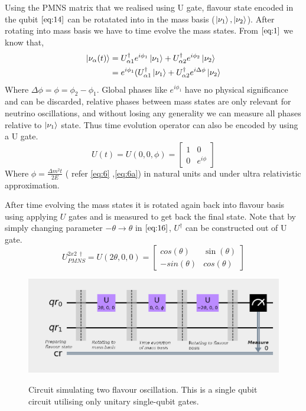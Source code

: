 \documentclass[12pt,a4paper]{report}
\begin{document}
Using the PMNS matrix that we realised using U gate, flavour state encoded in the qubit $\ref{eq:14}$ can be rotatated into in the mass basis ($\ket{\nu_{1}},\ket{\nu_{2}}$). After rotating into mass basis we have to time evolve the mass states. From $\ref{eq:1}$ we know that,
\begin{gather*}
\begin{split}
\ket{\nu_{\alpha}(t)}& = U_{\alpha 1}^{\dagger}e^{i\phi_{1}}\ket{\nu_{1}} + U_{\alpha 2}^{\dagger}e^{i\phi_{2}}\ket{\nu_{2}}\\
&=e^{i\phi_{1}}( U_{\alpha 1}^{\dagger}\ket{\nu_{1}} + U_{\alpha 2}^{\dagger} e^{ i\Delta\phi}\ket{\nu_{2}}
\end{split}
\end{gather*}
Where $\Delta\phi=\phi = \phi_{2}-\phi_{1}$.
Global phases like $e^{i\phi_{1}}$ have no physical significance and can be discarded\cite{benenti}, relative phases between mass states are only relevant for neutrino oscillations, and without losing any generality we can measure all phases relative to $\ket{\nu_{1}}$ state. Thus time evolution operator can also be encoded by using a U gate.
\begin{equation}
U(t) = U(0,0,\phi) = \begin{bmatrix} 1 & 0 \\ 0 & e^{i\phi} \end{bmatrix}
\end{equation}
Where $\phi = \frac {\Delta m^{2} t}{2E}$ ( refer \ref{eq:6} ,\ref{eq:6a}) in natural units and under ultra relativistic approximation.\par
After time evolving the mass states it is rotated again back into flavour basis using applying $U$ gates and is measured to get back the final state. Note that by simply changing parameter $-\theta \rightarrow \theta$ in $\ref{eq:16}$, $U^{\dagger}$ can be constructed out of U gate. 
\begin{equation}
U_{PMNS}^{2x2 \ \dagger}= U(2\theta,0,0) = \begin{bmatrix} cos(\theta) & \sin(\theta) \\ -sin(\theta) & cos(\theta) \end{bmatrix}
\end{equation}
\begin{figure}[h]
\graphicspath{ {./Images/} }
\centering	
{\includegraphics[scale=1]{fig_2.png}}
\caption{Circuit simulating two flavour oscillation\cite{jones}. This is a single qubit circuit utilising only unitary single-qubit gates. }
\label{fig 2}
\end{figure}
\end{document}

